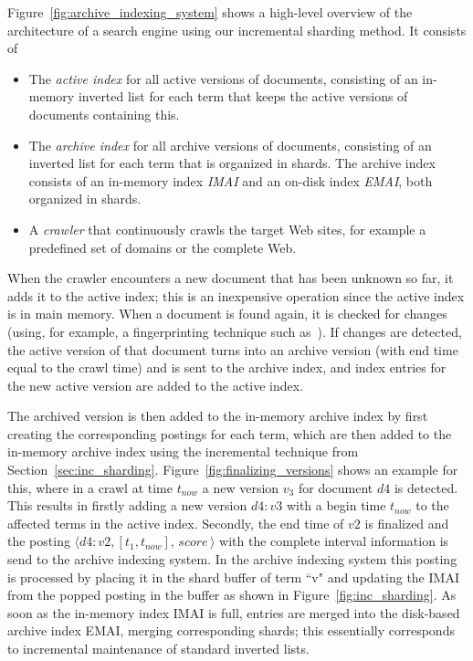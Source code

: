 Figure~\ref{fig:archive_indexing_system} shows a high-level overview
of the architecture of a search engine using our incremental sharding
method. It consists of
\begin{itemize}
\item The \emph{active index} for all active versions of documents,
  consisting of an in-memory inverted list for each term that keeps
  the active versions of documents containing this.
\item The \emph{archive index} for all archive versions of documents,
  consisting of an inverted list for each term that is organized in
  shards. The archive index consists of an in-memory index \emph{IMAI}
  and an on-disk index \emph{EMAI}, both organized in shards.
\item A \emph{crawler} that continuously crawls the target Web sites,
  for example a predefined set of domains or the complete Web.
\end{itemize}

When the crawler encounters a new document that has been unknown so
far, it adds it to the active index; this is an inexpensive operation
since the active index is in main memory. When a document is found
again, it is checked for changes (using, for example, a fingerprinting
technique such
as~\cite{DBLP:journals/cn/BroderGMZ97,DBLP:conf/sigir/Henzinger06}). If
changes are detected, the active version of that document turns into
an archive version (with end time equal to the crawl time) and is
sent to the archive index, and index entries for the new active
version are added to the active index.

The archived version is then added to the in-memory archive index by
first creating the corresponding postings for each term, which are
then added to the in-memory archive index using the incremental
technique from
Section~\ref{sec:inc_sharding}. Figure~\ref{fig:finalizing_versions}
shows an example for this, where in a crawl at time $t_{now}$ a new
version $v_3$ for document $d4$ is detected. This results in firstly
adding a new version $d4:v3$ with a begin time $t_{now}$ to the
affected terms in the active index. Secondly, the end time of $v2$ is
finalized and the posting $\langle d4:v2, [t_1, t_{now}], \, score
\,\rangle$ with the complete interval information is send to the
archive indexing system. In the archive indexing system this posting
is processed by placing it in the shard buffer of term ``v" and
updating the IMAI from the popped posting in the buffer as shown in
Figure~\ref{fig:inc_sharding}.  As soon as the in-memory index IMAI is
full, entries are merged into the disk-based archive index EMAI,
merging corresponding shards; this essentially corresponds to
incremental maintenance of standard inverted lists.


